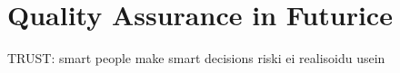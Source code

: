 
 \section{Quality Assurance in Futurice}



TRUST: smart people make smart decisions
riski ei realisoidu usein

% 
